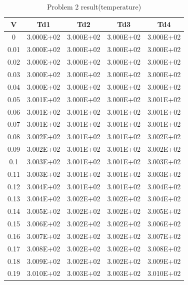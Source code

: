 \documentclass{article}
\begin{document}
    \begin{center}
        \begin{longtable}{|c|c|c|c|c|}
            \caption{Problem 2 result(temperature)} \label{tab:problem 2 temp} \\
            \hline
            V & Td1 & Td2 & Td3 & Td4 \\ \hline
            0 & 3.000E+02 & 3.000E+02 & 3.000E+02 & 3.000E+02 \\ \hline
            0.01 & 3.000E+02 & 3.000E+02 & 3.000E+02 & 3.000E+02 \\ \hline
            0.02 & 3.000E+02 & 3.000E+02 & 3.000E+02 & 3.000E+02 \\ \hline
            0.03 & 3.000E+02 & 3.000E+02 & 3.000E+02 & 3.000E+02 \\ \hline
            0.04 & 3.000E+02 & 3.000E+02 & 3.000E+02 & 3.000E+02 \\ \hline
            0.05 & 3.001E+02 & 3.000E+02 & 3.000E+02 & 3.001E+02 \\ \hline
            0.06 & 3.001E+02 & 3.001E+02 & 3.001E+02 & 3.001E+02 \\ \hline
            0.07 & 3.001E+02 & 3.001E+02 & 3.001E+02 & 3.001E+02 \\ \hline
            0.08 & 3.002E+02 & 3.001E+02 & 3.001E+02 & 3.002E+02 \\ \hline
            0.09 & 3.002E+02 & 3.001E+02 & 3.001E+02 & 3.002E+02 \\ \hline
            0.1 & 3.003E+02 & 3.001E+02 & 3.001E+02 & 3.003E+02 \\ \hline
            0.11 & 3.003E+02 & 3.001E+02 & 3.001E+02 & 3.003E+02 \\ \hline
            0.12 & 3.004E+02 & 3.001E+02 & 3.001E+02 & 3.004E+02 \\ \hline
            0.13 & 3.004E+02 & 3.002E+02 & 3.002E+02 & 3.004E+02 \\ \hline
            0.14 & 3.005E+02 & 3.002E+02 & 3.002E+02 & 3.005E+02 \\ \hline
            0.15 & 3.006E+02 & 3.002E+02 & 3.002E+02 & 3.006E+02 \\ \hline
            0.16 & 3.007E+02 & 3.002E+02 & 3.002E+02 & 3.007E+02 \\ \hline
            0.17 & 3.008E+02 & 3.002E+02 & 3.002E+02 & 3.008E+02 \\ \hline
            0.18 & 3.009E+02 & 3.002E+02 & 3.002E+02 & 3.009E+02 \\ \hline
            0.19 & 3.010E+02 & 3.003E+02 & 3.003E+02 & 3.010E+02 \\ \hline

\end{longtable}
\end{center}
\end{document}
